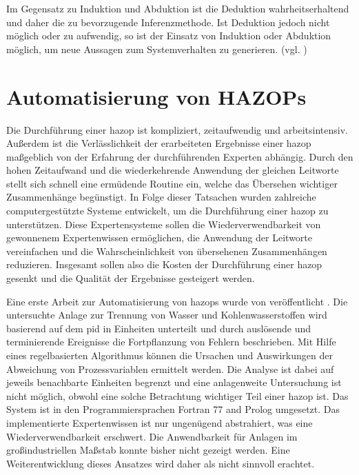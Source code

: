 Im Gegensatz zu Induktion und Abduktion ist die Deduktion wahrheitserhaltend und daher die zu bevorzugende Inferenzmethode. Ist Deduktion jedoch nicht m\"oglich oder zu aufwendig, so ist der Einsatz von Induktion oder Abduktion m\"oglich, um neue Aussagen zum Systemverhalten zu generieren. {(vgl. \cite[S. 28 ff.]{Dengel_2012})}

\section{Automatisierung von HAZOPs} \label{sec:fAna_automatHazop}
Die Durchf\"uhrung einer \ac{hazop} ist kompliziert, zeitaufwendig und arbeitsintensiv. Au\ss{}erdem ist die Verl\"asslichkeit der erarbeiteten Ergebnisse einer \ac{hazop} ma\ss{}geblich von der Erfahrung der durchf\"uhrenden Experten abh\"angig. Durch den hohen Zeitaufwand und die wiederkehrende Anwendung der gleichen Leitworte stellt sich schnell eine erm\"udende Routine ein, welche das \"Ubersehen wichtiger Zusammenh\"ange beg\"unstigt. In Folge dieser Tatsachen wurden zahlreiche computergest\"utzte Systeme entwickelt, um die Durchf\"uhrung einer \ac{hazop} zu unterst\"utzen. Diese Expertensysteme sollen die Wiederverwendbarkeit von gewonnenem Expertenwissen erm\"oglichen, die Anwendung der Leitworte vereinfachen und die Wahrscheinlichkeit von \"ubersehenen Zusammenh\"angen reduzieren. Insgesamt sollen also die Kosten der Durchf\"uhrung einer \ac{hazop} gesenkt und die Qualit\"at der Ergebnisse gesteigert werden. 

Eine erste Arbeit zur Automatisierung von \acp{hazop} wurde von \citeauthor{Parmar_1987} ver\"offentlicht \cite{Parmar_1987,Parmar_1987a}. Die untersuchte Anlage zur Trennung von Wasser und Kohlenwasserstoffen wird basierend auf dem \ac{pid} in Einheiten unterteilt und durch ausl\"osende und terminierende Ereignisse die Fortpflanzung von Fehlern beschrieben. Mit Hilfe eines regelbasierten Algorithmus k\"onnen die Ursachen und Auswirkungen der Abweichung von Prozessvariablen ermittelt werden. Die Analyse ist dabei auf jeweils benachbarte Einheiten begrenzt und eine anlagenweite Untersuchung ist nicht m\"oglich, obwohl eine solche Betrachtung  wichtiger Teil einer \ac{hazop} ist. Das System ist in den Programmiersprachen Fortran 77 and Prolog umgesetzt. Das implementierte Expertenwissen ist nur ungen\"ugend abstrahiert, was eine Wiederverwendbarkeit erschwert. Die Anwendbarkeit f\"ur Anlagen im gro\ss{}industriellen Ma\ss{}stab konnte bisher nicht gezeigt werden. Eine Weiterentwicklung dieses Ansatzes wird daher als nicht sinnvoll erachtet.

